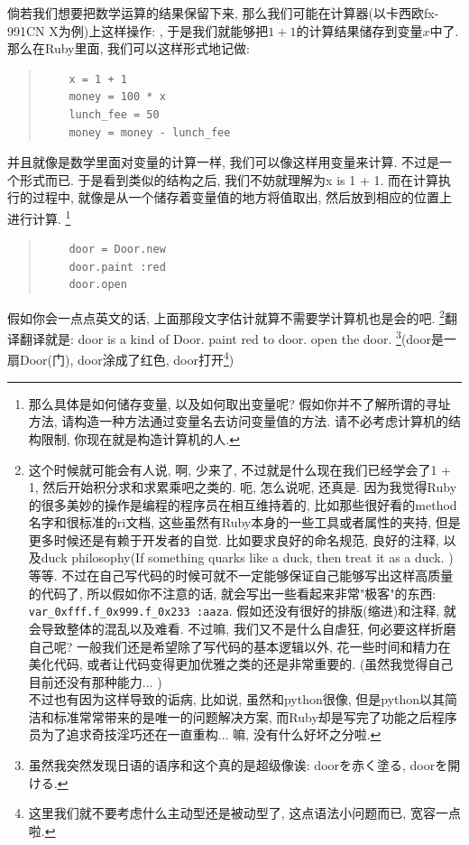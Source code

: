 倘若我们想要把数学运算的结果保留下来, 那么我们可能在计算器(以卡西欧fx-991CN X为例)上这样操作:  \fbox{+}   , 于是我们就能够把$1 + 1$的计算结果储存到变量$x$中了. 那么在Ruby里面, 我们可以这样形式地记做: 

\begin{quotation}
  \begin{verbatim}
    x = 1 + 1
    money = 100 * x
    lunch_fee = 50
    money = money - lunch_fee
  \end{verbatim}
\end{quotation}

并且就像是数学里面对变量的计算一样, 我们可以像这样用变量来计算. 不过是一个形式而已. 于是看到类似的结构之后, 我们不妨就理解为x is 1 + 1. 而在计算执行的过程中, 就像是从一个储存着变量值的地方将值取出, 然后放到相应的位置上进行计算. \footnote{那么具体是如何储存变量, 以及如何取出变量呢? 假如你并不了解所谓的寻址方法, 请构造一种方法通过变量名去访问变量值的方法. 请不必考虑计算机的结构限制, 你现在就是构造计算机的人. }

\begin{quotation}
  \begin{verbatim}
    door = Door.new
    door.paint :red
    door.open
  \end{verbatim}
\end{quotation}

假如你会一点点英文的话, 上面那段文字估计就算不需要学计算机也是会的吧. \footnote{这个时候就可能会有人说, 啊, 少来了, 不过就是什么现在我们已经学会了1 + 1, 然后开始积分求和求累乘吧之类的. 呃, 怎么说呢, 还真是. 因为我觉得Ruby的很多美妙的操作是编程的程序员在相互维持着的, 比如那些很好看的method名字和很标准的ri文档, 这些虽然有Ruby本身的一些工具或者属性的夹持, 但是更多时候还是有赖于开发者的自觉. 比如要求良好的命名规范, 良好的注释, 以及duck philosophy(If something quarks like a duck, then treat it as a duck. )等等. 不过在自己写代码的时候可就不一定能够保证自己能够写出这样高质量的代码了, 所以假如你不注意的话, 就会写出一些看起来非常"极客"的东西: \texttt{var_0xfff.f_0x999.f_0x233 :aaza}. 假如还没有很好的排版(缩进)和注释, 就会导致整体的混乱以及难看. 不过嘛, 我们又不是什么自虐狂, 何必要这样折磨自己呢? 一般我们还是希望除了写代码的基本逻辑以外, 花一些时间和精力在美化代码, 或者让代码变得更加优雅之类的还是非常重要的. (虽然我觉得自己目前还没有那种能力... )\\不过也有因为这样导致的诟病, 比如说, 虽然和python很像, 但是python以其简洁和标准常常带来的是唯一的问题解决方案, 而Ruby却是写完了功能之后程序员为了追求奇技淫巧还在一直重构... 嘛, 没有什么好坏之分啦. }翻译翻译就是: door is a kind of Door. paint red to door. open the door. \footnote{虽然我突然发现日语的语序和这个真的是超级像诶: doorを赤く塗る, doorを開ける. }(door是一扇Door(门), door涂成了红色, door打开\footnote{这里我们就不要考虑什么主动型还是被动型了, 这点语法小问题而已, 宽容一点啦. })

